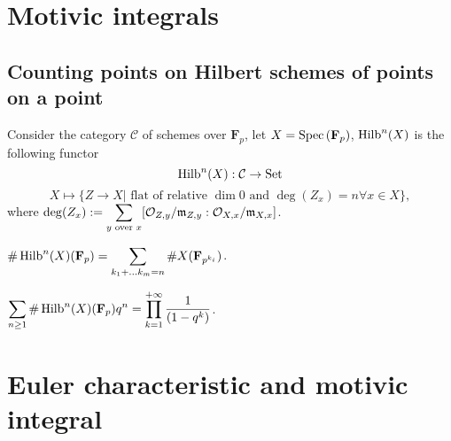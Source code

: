 \documentclass[main.tex]{subfiles}
\begin{document}
\section{Motivic integrals}

\subsection{Counting points on Hilbert schemes of points on a point}
Consider the category $\mathcal{C}$ of schemes over $\mathbf{F}_{p}$, let $X=\operatorname{Spec\,}(\mathbf{F}_{p})$, $\operatorname{Hilb}^{n}(X)$ is the following functor
$$
   \operatorname{Hilb}^{n}(X): \mathcal{C} \rightarrow \mathrm{Set}$$
$$   X \mapsto \{Z\rightarrow X|\text{ flat of relative } \dim 0 \text{ and } \deg(Z_{x}) = n \forall x \in X\},
$$
where $\deg(Z_{x}):=\displaystyle \sum_{y \text{ over }x}[\mathcal{O}_{Z,y}/\mathfrak{m}_{Z,y}:\mathcal{O}_{X, x}/\mathfrak{m}_{X,x}]$. 
\begin{proposition}
$\displaystyle \#\operatorname{Hilb}^{n}(X)(\mathbf{F}_{p})= \sum_{k_{1}+\dots k_{m}=n}\#X(\mathbf{F}_{p^{k_{i}}})$.
\end{proposition}
\begin{corollary}
$\displaystyle \sum_{n\geq 1}\#\operatorname{Hilb}^{n}(X)(\mathbf{F}_{p})q^{n}=\displaystyle \prod_{k=1}^{+\infty}\frac{1}{(1-q^{k})}$.
\end{corollary}







\section{Euler characteristic and motivic integral}
\end{document}
